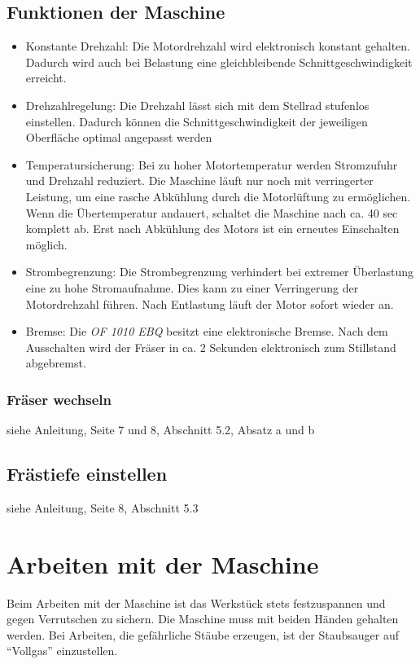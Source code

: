 \documentclass{\basedir/fablab-document}
\begin{document}
\subsection{Funktionen der Maschine}
\begin{itemize}
\item Konstante Drehzahl: Die Motordrehzahl wird elektronisch konstant gehalten. Dadurch wird auch bei Belastung eine gleichbleibende Schnittgeschwindigkeit erreicht.
\item Drehzahlregelung: Die Drehzahl lässt sich mit dem Stellrad stufenlos einstellen. Dadurch können die Schnittgeschwindigkeit der jeweiligen Oberfläche optimal angepasst werden 
\item Temperatursicherung: Bei zu hoher Motortemperatur werden Stromzufuhr und Drehzahl reduziert. Die Maschine läuft nur noch mit verringerter Leistung, um eine rasche Abkühlung durch die Motorlüftung zu ermöglichen. Wenn die Übertemperatur andauert, schaltet die Maschine nach ca. 40 sec komplett ab. Erst nach Abkühlung des Motors ist ein erneutes Einschalten möglich.
\item Strombegrenzung: Die Strombegrenzung verhindert bei extremer Überlastung eine zu hohe Stromaufnahme. Dies kann zu einer Verringerung der Motordrehzahl führen. Nach Entlastung läuft der Motor sofort wieder an.
\item Bremse: Die \textit{OF 1010 EBQ} besitzt eine elektronische Bremse. Nach dem Ausschalten wird der Fräser in ca. 2 Sekunden elektronisch zum Stillstand abgebremst.
\end{itemize}

\subsubsection{Fräser wechseln}
siehe Anleitung, Seite 7 und 8, Abschnitt 5.2, Absatz a und b

\subsection{Frästiefe einstellen}
siehe Anleitung, Seite 8, Abschnitt 5.3

\section{Arbeiten mit der Maschine}
Beim Arbeiten mit der Maschine ist das Werkstück stets festzuspannen und gegen Verrutschen zu sichern. Die Maschine muss mit beiden Händen gehalten werden. Bei Arbeiten, die gefährliche Stäube erzeugen, ist der Staubsauger auf ``Vollgas'' einzustellen.
\end{document}
